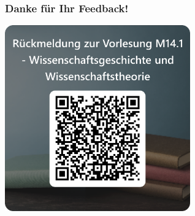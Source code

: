 \documentclass{beamer}
\begin{document}

\begin{frame}
\frametitle{Danke für Ihr Feedback!}
\begin{center}
\includegraphics[width=0.6\textwidth]{feedback_QR.png}
\end{center}

\end{frame}
\end{document}
